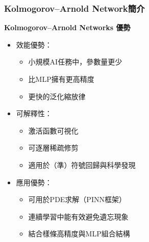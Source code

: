 \documentclass{beamer}
\begin{document}
\begin{frame}
    \frametitle{Kolmogorov–Arnold Network簡介}
    \centering
    \textbf{Kolmogorov–Arnold Networks 優勢}\\[0.5cm]
    \begin{itemize}
        \item 效能優勢：
        \begin{itemize}
            \item 小規模AI任務中，參數量更少
            \item 比MLP擁有更高精度
            \item 更快的泛化縮放律
        \end{itemize}
        \item 可解釋性：
        \begin{itemize}
            \item 激活函數可視化
            \item 可逐層稀疏修剪
            \item 適用於（準）符號回歸與科學發現
        \end{itemize}
        \item 應用優勢：
        \begin{itemize}
            \item 可用於PDE求解（PINN框架）
            \item 連續學習中能有效避免遺忘現象
            \item 結合樣條高精度與MLP組合結構
        \end{itemize}
    \end{itemize}
\end{frame}
\end{document}
